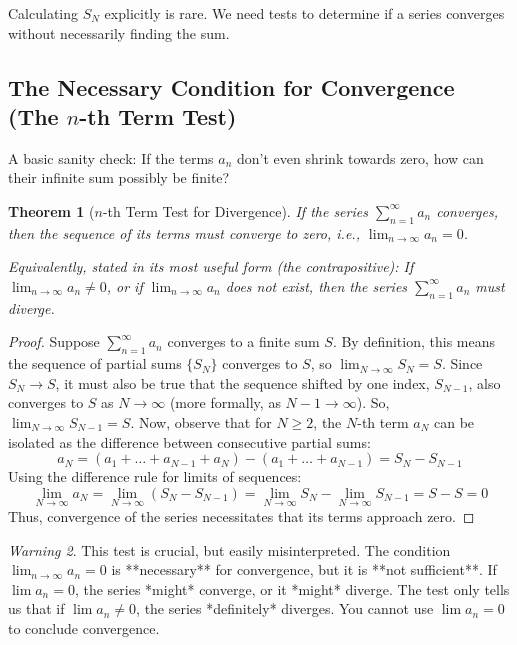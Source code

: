\documentclass[11pt, letterpaper]{article}
\theoremstyle{plain} %
\newtheorem{theorem}{Theorem}[section] %
\theoremstyle{definition} %
\theoremstyle{remark} %
\newtheorem{warning}[theorem]{Warning} %
\begin{document}
Calculating $S_N$ explicitly is rare. We need tests to determine if a series converges without necessarily finding the sum.

\subsection{The Necessary Condition for Convergence (The \texorpdfstring{$n$}{n}-th Term Test)}

A basic sanity check: If the terms $a_n$ don't even shrink towards zero, how can their infinite sum possibly be finite?

\begin{theorem}[$n$-th Term Test for Divergence]
If the series $\sum_{n=1}^{\infty} a_n$ converges, then the sequence of its terms must converge to zero, i.e., $\lim_{n \to \infty} a_n = 0$.

Equivalently, stated in its most useful form (the contrapositive):
If $\lim_{n \to \infty} a_n \neq 0$, or if $\lim_{n \to \infty} a_n$ does not exist, then the series $\sum_{n=1}^{\infty} a_n$ must diverge.
\end{theorem}

\begin{proof}
Suppose $\sum_{n=1}^{\infty} a_n$ converges to a finite sum $S$. By definition, this means the sequence of partial sums $\{S_N\}$ converges to $S$, so $\lim_{N \to \infty} S_N = S$.
Since $S_N \to S$, it must also be true that the sequence shifted by one index, $S_{N-1}$, also converges to $S$ as $N \to \infty$ (more formally, as $N-1 \to \infty$). So, $\lim_{N \to \infty} S_{N-1} = S$.
Now, observe that for $N \ge 2$, the $N$-th term $a_N$ can be isolated as the difference between consecutive partial sums:
\[ a_N = (a_1 + \dots + a_{N-1} + a_N) - (a_1 + \dots + a_{N-1}) = S_N - S_{N-1} \]
Using the difference rule for limits of sequences:
\[ \lim_{N \to \infty} a_N = \lim_{N \to \infty} (S_N - S_{N-1}) = \lim_{N \to \infty} S_N - \lim_{N \to \infty} S_{N-1} = S - S = 0 \]
Thus, convergence of the series necessitates that its terms approach zero.
\end{proof}

\begin{warning}
This test is crucial, but easily misinterpreted.
The condition $\lim_{n \to \infty} a_n = 0$ is **necessary** for convergence, but it is **not sufficient**.
If $\lim a_n = 0$, the series *might* converge, or it *might* diverge. The test only tells us that if $\lim a_n \neq 0$, the series *definitely* diverges. You cannot use $\lim a_n = 0$ to conclude convergence.
\end{warning}
\end{document}
